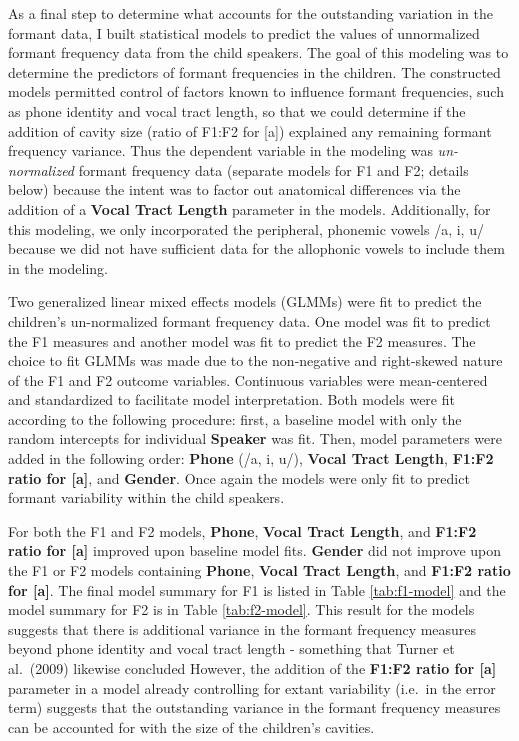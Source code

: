 \documentclass[
]{article}
\begin{document}
As a final step to determine what accounts for the outstanding variation in the formant data, I built statistical models to predict the values of unnormalized formant frequency data from the child speakers. The goal of this modeling was to determine the predictors of formant frequencies in the children. The constructed models permitted control of factors known to influence formant frequencies, such as phone identity and vocal tract length, so that we could determine if the addition of cavity size (ratio of F1:F2 for {[}a{]}) explained any remaining formant frequency variance. Thus the dependent variable in the modeling was \emph{un-normalized} formant frequency data (separate models for F1 and F2; details below) because the intent was to factor out anatomical differences via the addition of a \textbf{Vocal Tract Length} parameter in the models. Additionally, for this modeling, we only incorporated the peripheral, phonemic vowels /a, i, u/ because we did not have sufficient data for the allophonic vowels to include them in the modeling.

Two generalized linear mixed effects models (GLMMs) were fit to predict the children's un-normalized formant frequency data. One model was fit to predict the F1 measures and another model was fit to predict the F2 measures. The choice to fit GLMMs was made due to the non-negative and right-skewed nature of the F1 and F2 outcome variables. Continuous variables were mean-centered and standardized to facilitate model interpretation. Both models were fit according to the following procedure: first, a baseline model with only the random intercepts for individual \textbf{Speaker} was fit. Then, model parameters were added in the following order: \textbf{Phone} (/a, i, u/), \textbf{Vocal Tract Length}, \textbf{F1:F2 ratio for {[}a{]}}, and \textbf{Gender}. Once again the models were only fit to predict formant variability within the child speakers.

For both the F1 and F2 models, \textbf{Phone}, \textbf{Vocal Tract Length}, and \textbf{F1:F2 ratio for {[}a{]}} improved upon baseline model fits. \textbf{Gender} did not improve upon the F1 or F2 models containing \textbf{Phone}, \textbf{Vocal Tract Length}, and \textbf{F1:F2 ratio for {[}a{]}}. The final model summary for F1 is listed in Table \ref{tab:f1-model} and the model summary for F2 is in Table \ref{tab:f2-model}. This result for the models suggests that there is additional variance in the formant frequency measures beyond phone identity and vocal tract length - something that Turner et al.~(2009) likewise concluded However, the addition of the \textbf{F1:F2 ratio for {[}a{]}} parameter in a model already controlling for extant variability (i.e.~in the error term) suggests that the outstanding variance in the formant frequency measures can be accounted for with the size of the children's cavities.
\end{document}

